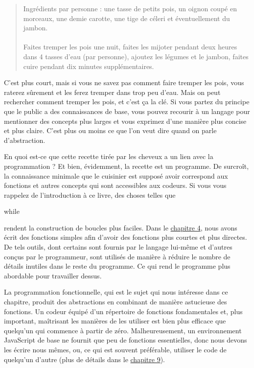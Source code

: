 \documentclass{FramateX}
\renewcommand{\texttt}[1]{\begin{sffamily}{#1}\end{sffamily}}
\begin{document}
\begin{quote}
Ingrédients par personne : une tasse de petits pois, un oignon coupé en
morceaux, une demie carotte, une tige de céleri et éventuellement du
jambon.\\\\Faites tremper les pois une nuit, faites les mijoter pendant
deux heures dans 4 tasses d'eau (par personne), ajoutez les légumes et
le jambon, faites cuire pendant dix minutes supplémentaires.
\end{quote}
C'est plus court, mais si vous ne savez pas comment faire tremper les
pois, vous raterez sûrement et les ferez tremper dans trop peu d'eau.
Mais on peut rechercher comment tremper les pois, et c'est ça la clé. Si
vous partez du principe que le public a des connaissances de base, vous
pouvez recourir à un langage pour mentionner des concepts plus larges et
vous exprimez d'une manière plus concise et plus claire. C'est plus ou
moins ce que l'on veut dire quand on parle d'abstraction.

En quoi est-ce que cette recette tirée par les cheveux a un lien avec la
programmation ? Et bien, évidemment, la recette est un programme. De
surcroît, la connaissance minimale que le cuisinier est supposé avoir
correspond aux fonctions et autres concepts qui sont accessibles aux
codeurs. Si vous vous rappelez de l'introduction à ce livre, des choses
telles que \texttt{while} rendent la construction de boucles plus
faciles. Dans le \href{chapter4.html}{chapitre 4}, nous avons écrit des
fonctions simples afin d'avoir des fonctions plus courtes et plus
directes. De tels outils, dont certains sont fournis par le langage
lui-même et d'autres conçus par le programmeur, sont utilisés de manière
à réduire le nombre de détails inutiles dans le reste du programme. Ce
qui rend le programme plus abordable pour travailler dessus.

\begin{center}\end{center}

La programmation fonctionnelle, qui est le sujet qui nous intéresse dans
ce chapitre, produit des abstractions en combinant de manière astucieuse
des fonctions. Un codeur équipé d'un répertoire de fonctions
fondamentales et, plus important, maîtrisant les manières de les
utiliser est bien plus efficace que quelqu'un qui commence à partir de
zéro. Malheureusement, un environnement JavaScript de base ne fournit
que peu de fonctions essentielles, donc nous devons les écrire nous
mêmes, ou, ce qui est souvent préférable, utiliser le code de quelqu'un
d'autre (plus de détails dans le \href{chapter9.html}{chapitre 9}).
\end{document}
